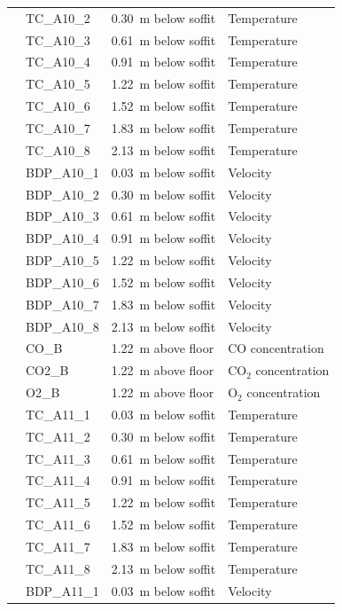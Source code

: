 \documentclass[12pt,oneside]{book}
\begin{document}
\begin{longtable}[c]{c|lll}
 & TC\_A10\_2  & 0.30~m below soffit & Temperature \\
 & TC\_A10\_3  & 0.61~m below soffit & Temperature \\
 & TC\_A10\_4  & 0.91~m below soffit & Temperature \\
 & TC\_A10\_5  & 1.22~m below soffit & Temperature \\
 & TC\_A10\_6  & 1.52~m below soffit & Temperature \\
 & TC\_A10\_7  & 1.83~m below soffit & Temperature \\
 & TC\_A10\_8  & 2.13~m below soffit & Temperature \\
\cline{2-4}
 & BDP\_A10\_1 & 0.03~m below soffit  & Velocity \\
 & BDP\_A10\_2 & 0.30~m below soffit  & Velocity \\
 & BDP\_A10\_3 & 0.61~m below soffit  & Velocity \\
 & BDP\_A10\_4 & 0.91~m below soffit  & Velocity \\
 & BDP\_A10\_5 & 1.22~m below soffit  & Velocity \\
 & BDP\_A10\_6 & 1.52~m below soffit  & Velocity \\
 & BDP\_A10\_7 & 1.83~m below soffit  & Velocity \\
 & BDP\_A10\_8 & 2.13~m below soffit  & Velocity \\
\cline{2-4}
 & CO\_B      & 1.22~m above floor   & CO concentration \\
 & CO2\_B     & 1.22~m above floor   & CO$_2$ concentration \\
 & O2\_B      & 1.22~m above floor   & O$_2$ concentration \\
\bottomrule
\newpage
\multirow{16}{*}{\large{\textbf{A11}}}
 & TC\_A11\_1  & 0.03~m below soffit  & Temperature \\
 & TC\_A11\_2  & 0.30~m below soffit  & Temperature \\
 & TC\_A11\_3  & 0.61~m below soffit  & Temperature \\
 & TC\_A11\_4  & 0.91~m below soffit  & Temperature \\
 & TC\_A11\_5  & 1.22~m below soffit  & Temperature \\
 & TC\_A11\_6  & 1.52~m below soffit  & Temperature \\
 & TC\_A11\_7  & 1.83~m below soffit  & Temperature \\
 & TC\_A11\_8  & 2.13~m below soffit  & Temperature \\
\cline{2-4}
 & BDP\_A11\_1 & 0.03~m below soffit  & Velocity \\

\end{longtable}
\end{document}
